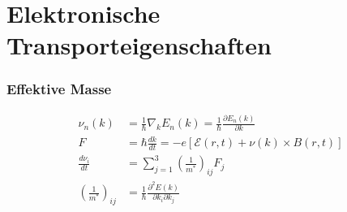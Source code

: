 \section{Elektronische Transporteigenschaften}


\subsubsection*{Effektive Masse}

\begin{equation*}
    \begin{aligned}
        \nu_n(k) &= \frac{1}{\hbar} \nabla_k E_n(k) = \frac{1}{\hbar} \frac{\partial E_n(k)}{\partial k} \\
        F &= \hbar \frac{dk}{dt} = -e \left[\mathcal{E}(r,t) + \nu (k) \times B(r,t)\right] \\
        \frac{d \nu_i}{dt} &= \sum_{j=1}^3 \left(\frac{1}{m^*}\right)_{ij} F_j \\
        \left(\frac{1}{m^*}\right)_{ij} &= \frac{1}{\hbar} \frac{\partial^2 E(k)}{\partial k_i \partial k_j}
    \end{aligned}
\end{equation*}